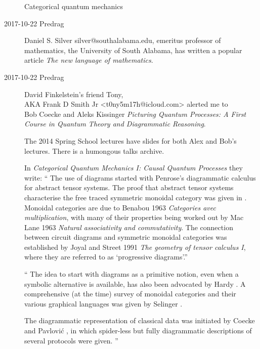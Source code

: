 \begin{description}

{Categorical quantum mechanics}

\item[2017-10-22 Predrag]
{Daniel S. Silver} silver@southalabama.edu, emeritus professor of mathematics,
the University of South Alabama, has written a popular article
{\em The new language of mathematics}.

\item[2017-10-22 Predrag] David Finkelstein's friend Tony,
\\
AKA Frank D Smith Jr <t0ny5m17h@icloud.com> alerted me to
\\

 {Bob Coecke} and
 {Aleks Kissinger}
{\em Picturing Quantum Processes: A First Course in Quantum Theory and
Diagrammatic Reasoning}.

The 2014 Spring School 
{lectures} have slides for both Alex and Bob's lectures. There is a humongous
 {talks archive}.

In {\em Categorical Quantum Mechanics I: Causal Quantum Processes}
they write: ``
The use of diagrams started with Penrose's diagrammatic calculus for abstract
tensor  systems.  The  proof  that  abstract  tensor  systems
characterise  the free traced symmetric monoidal category was given in
. Monoidal categories are due to Benabou 1963 {\em Categories
avec multiplication}, with many of their properties being worked out by Mac
Lane 1963 {\em Natural associativity and commutativity}.  The connection
between circuit diagrams and symmetric monoidal categories was established by
Joyal and Street 1991 {\em The geometry of tensor calculus I}, where they are
referred to as `progressive diagrams'.''

``
The idea to start with diagrams as a primitive notion, even when a symbolic
alternative is available, has also been advocated by Hardy . A
comprehensive (at the time) survey of monoidal categories and their various
graphical languages was given by Selinger .

The diagrammatic representation of classical data was initiated by Coecke and
Pavlovi\'c , in which spider-less but fully diagrammatic
descriptions of several protocols were given.
''


\end{description}
